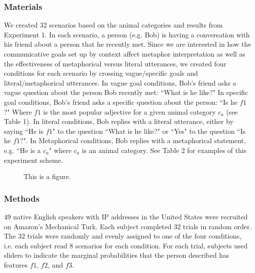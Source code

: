 \documentclass[10pt,letterpaper]{article}
\begin{document}
\subsubsection{Materials}
We created $32$ scenarios based on the animal categories and results from Experiment 1. In each scenario, a person (e.g. Bob) is having a conversation with his friend about a person that he recently met. Since we are interested in how the communicative goals set up by context affect metaphor interpretation as well as the effectiveness of metaphorical versus literal utterances, we created four conditions for each scenario by crossing vague/specific goals and literal/metaphorical utterances. In vague goal conditions, Bob's friend asks a vague question about the person Bob recently met: ``What is he like?" In specific goal conditions, Bob's friend asks a specific question about the person: ``Is he $f1$?" Where $f1$ is the most popular adjective for a given animal category $c_a$ (see Table 1). In literal conditions, Bob replies with a literal utterance, either by saying ``He is $f1$" to the question ``What is he like?" or ``Yes" to the question ``Is he $f1$?". In Metaphorical conditions, Bob replies with a metaphorical statement, e.g. ``He is a $c_a$" where $c_a$ is an animal category. See Table 2 for examples of this experiment scheme.

\begin{figure}[t]
\begin{center}
\end{center}
\caption{This is a figure.} 
\label{human_bar}
\end{figure}

\subsubsection{Methods}
$49$ native English speakers with IP addresses in the United States were recruited on Amazon's Mechanical Turk. Each subject completed $32$ trials in random order. The $32$ trials were randomly and evenly assigned to one of the four conditions, i.e. each subject read $8$ scenarios for each condition. For each trial, subjects used sliders to indicate the marginal probabilities that the person described has features $f1$, $f2$, and $f3$.
\end{document}
